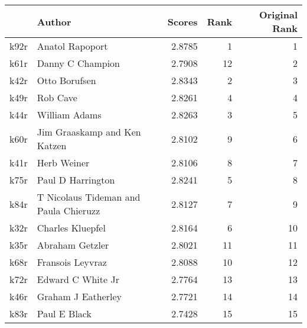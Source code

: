 \begin{tabular}{llrrr}
\toprule
{} &                                 Author &  Scores &  Rank &  Original Rank \\
\midrule
k92r &                        Anatol Rapoport &  2.8785 &     1 &              1 \\
k61r &                       Danny C Champion &  2.7908 &    12 &              2 \\
k42r &                          Otto Borufsen &  2.8343 &     2 &              3 \\
k49r &                               Rob Cave &  2.8261 &     4 &              4 \\
k44r &                          William Adams &  2.8263 &     3 &              5 \\
k60r &           Jim Graaskamp and Ken Katzen &  2.8102 &     9 &              6 \\
k41r &                            Herb Weiner &  2.8106 &     8 &              7 \\
k75r &                      Paul D Harrington &  2.8241 &     5 &              8 \\
k84r &  T Nicolaus Tideman and Paula Chieruzz &  2.8127 &     7 &              9 \\
k32r &                       Charles Kluepfel &  2.8164 &     6 &             10 \\
k35r &                        Abraham Getzler &  2.8021 &    11 &             11 \\
k68r &                       Fransois Leyvraz &  2.8088 &    10 &             12 \\
k72r &                      Edward C White Jr &  2.7764 &    13 &             13 \\
k46r &                     Graham J Eatherley &  2.7721 &    14 &             14 \\
k83r &                           Paul E Black &  2.7428 &    15 &             15 \\
\bottomrule
\end{tabular}
